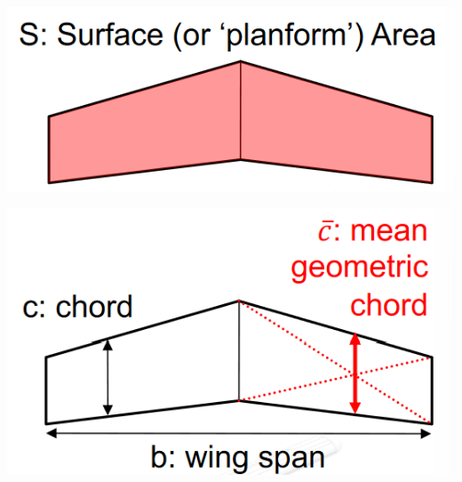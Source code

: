 \documentclass[landscape,a0paper,fontscale=0.285]{baposter} %
\begin{document}
\begin{poster}
{\begin{minipage}[c]{0.475\textwidth}
    \includegraphics[width=\textwidth]{images/fixed_wing_surface.png}
\end{minipage}
\hfill
\begin{minipage}[c]{0.475\textwidth}
    \includegraphics[width=\textwidth]{images/fixed_wing_parameter.png}
\end{minipage}

}


\end{poster}
\end{document}
